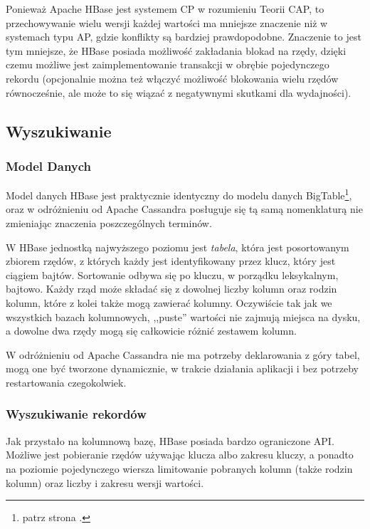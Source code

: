 Ponieważ Apache HBase jest systemem CP w rozumieniu Teorii CAP, to przechowywanie wielu wersji każdej wartości ma mniejsze znaczenie niż w systemach typu AP, gdzie konflikty są bardziej prawdopodobne.
Znaczenie to jest tym mniejsze, że HBase posiada możliwość zakładania blokad na rzędy, dzięki czemu możliwe jest zaimplementowanie transakcji w obrębie pojedynczego rekordu (opcjonalnie można też włączyć możliwość blokowania wielu rzędów równocześnie, ale może to się wiązać z negatywnymi skutkami dla wydajności).

\subsection*{Wyszukiwanie}

\subsubsection*{Model Danych}

Model danych HBase jest praktycznie identyczny do modelu danych BigTable\footnote{patrz strona \pageref{google-bigtable-model-danych}.}, oraz w odróżnieniu od Apache Cassandra posługuje się tą samą nomenklaturą nie zmieniając znaczenia poszczególnych terminów.

W HBase jednostką najwyższego poziomu jest \emph{tabela}, która jest posortowanym zbiorem rzędów, z których każdy jest identyfikowany przez klucz, który jest ciągiem bajtów.
Sortowanie odbywa się po kluczu, w porządku leksykalnym, bajtowo.
Każdy rząd może składać się z dowolnej liczby kolumn oraz rodzin kolumn, które z kolei także mogą zawierać kolumny.
Oczywiście tak jak we wszystkich bazach kolumnowych, ,,puste'' wartości nie zajmują miejsca na dysku, a dowolne dwa rzędy mogą się całkowicie różnić zestawem kolumn.

W odróżnieniu od Apache Cassandra nie ma potrzeby deklarowania z góry tabel, mogą one być tworzone dynamicznie, w trakcie działania aplikacji i bez potrzeby restartowania czegokolwiek.

\subsubsection*{Wyszukiwanie rekordów}

Jak przystało na kolumnową bazę, HBase posiada bardzo ograniczone API.
Możliwe jest pobieranie rzędów używając klucza albo zakresu kluczy, a ponadto na poziomie pojedynczego wiersza limitowanie pobranych kolumn (także rodzin kolumn) oraz liczby i zakresu wersji wartości.


